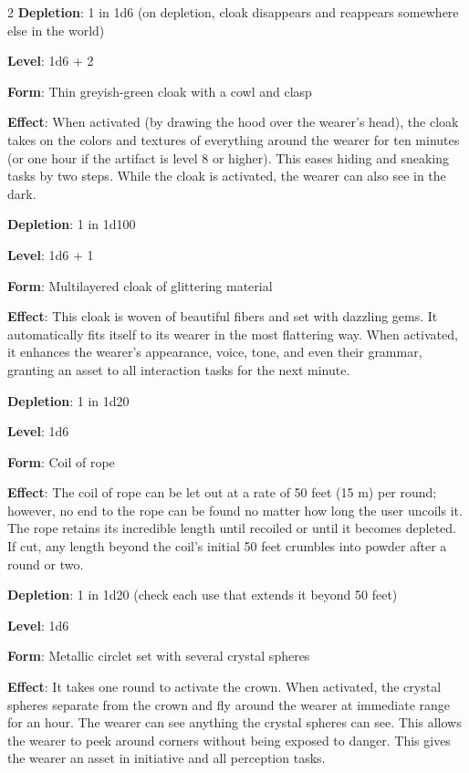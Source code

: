\begin{multicols}{2}
\textbf{Depletion}: 1 in 1d6 (on depletion, cloak disappears and reappears somewhere else in the world) 


\textbf{Level}: 1d6 + 2 

\textbf{Form}: Thin greyish-green cloak with a cowl and clasp 

\textbf{Effect}: When activated (by drawing the hood over the wearer’s head), the cloak takes on the colors and textures of everything around the wearer for ten minutes (or one hour if the artifact is level 8 or higher). This eases hiding and sneaking tasks by two steps. While the cloak is activated, the wearer can also see in the dark. 

\textbf{Depletion}: 1 in 1d100


\textbf{Level}: 1d6 + 1 

\textbf{Form}: Multilayered cloak of glittering material 

\textbf{Effect}: This cloak is woven of beautiful fibers and set with dazzling gems. It automatically fits itself to its wearer in the most flattering way. When activated, it enhances the wearer’s appearance, voice, tone, and even their grammar, granting an asset to all interaction tasks for the next minute. 

\textbf{Depletion}: 1 in 1d20 


\textbf{Level}: 1d6 

\textbf{Form}: Coil of rope 

\textbf{Effect}: The coil of rope can be let out at a rate of 50 feet (15 m) per round; however, no end to the rope can be found no matter how long the user uncoils it. The rope retains its incredible length until recoiled or until it becomes depleted. If cut, any length beyond the coil’s initial 50 feet crumbles into powder after a round or two. 

\textbf{Depletion}: 1 in 1d20 (check each use that extends it beyond 50 feet) 


\textbf{Level}: 1d6 

\textbf{Form}: Metallic circlet set with several crystal spheres 

\textbf{Effect}: It takes one round to activate the crown. When activated, the crystal spheres separate from the crown and fly around the wearer at immediate range for an hour. The wearer can see anything the crystal spheres can see. This allows the wearer to peek around corners without being exposed to danger. This gives the wearer an asset in initiative and all perception tasks. 


\end{multicols}
